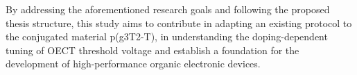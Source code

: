 By addressing the aforementioned research goals and following the proposed thesis structure, this study aims to contribute in adapting an existing protocol to the conjugated material p(g3T2-T), in understanding the doping-dependent tuning of OECT threshold voltage and establish a foundation for the development of high-performance organic electronic devices.

